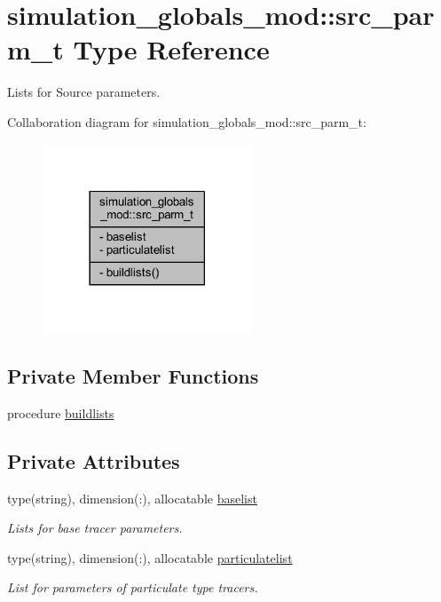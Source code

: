 \hypertarget{structsimulation__globals__mod_1_1src__parm__t}{}\section{simulation\+\_\+globals\+\_\+mod\+:\+:src\+\_\+parm\+\_\+t Type Reference}
\label{structsimulation__globals__mod_1_1src__parm__t}


Lists for Source parameters.  




Collaboration diagram for simulation\+\_\+globals\+\_\+mod\+:\+:src\+\_\+parm\+\_\+t\+:\nopagebreak
\begin{figure}[H]
\begin{center}
\leavevmode
\includegraphics[width=177pt]{structsimulation__globals__mod_1_1src__parm__t__coll__graph}
\end{center}
\end{figure}
\subsection*{Private Member Functions}
\begin{DoxyCompactItemize}
\item 
procedure \mbox{\hyperlink{structsimulation__globals__mod_1_1src__parm__t_a02237bb7b77e69d8674b65de89e46793}{buildlists}}
\end{DoxyCompactItemize}
\subsection*{Private Attributes}
\begin{DoxyCompactItemize}
\item 
type(string), dimension(\+:), allocatable \mbox{\hyperlink{structsimulation__globals__mod_1_1src__parm__t_a613e2024516b63fd3b3a524ceffe4956}{baselist}}
\begin{DoxyCompactList}\small\item\em Lists for base tracer parameters. \end{DoxyCompactList}\item 
type(string), dimension(\+:), allocatable \mbox{\hyperlink{structsimulation__globals__mod_1_1src__parm__t_ab259c4c5cd79464ea8159a87334c982f}{particulatelist}}
\begin{DoxyCompactList}\small\item\em List for parameters of particulate type tracers. \end{DoxyCompactList}\end{DoxyCompactItemize}


